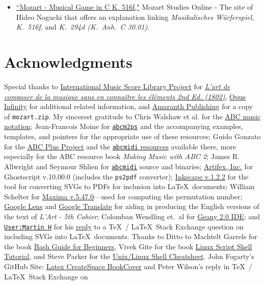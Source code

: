 \documentclass[a4paper,x11names,svgnames,10pt]{article}
\begin{document}
{\begin{itemize}
	\item \href{(http://www.asahi-net.or.jp/\~rb5h-ngc/e/k516f.htm}{``Mozart - Musical Game in C K. 516f,"}	Mozart Studies Online - The site of Hideo Noguchi that offers an explanation linking {\em Musikalisches W\"{u}rferspiel, K.\ 516f}, and  {\em K.\ 294d (K.\ Anh.\ C 30.01)}. 
\end{itemize}

\newpage
\section{Acknowledgments}
Special thanks to \href{https://imslp.org}{International Music Score Library Project} for \href{https://imslp.org/wiki/L'art\_de_composer\_de\_la_musique\_sans\_en\_conna\%C3\%AEtre\_les\_\%C3\%A9l\%C3\%A9ments\_(Calegari\%2C\_Antonio)}{\it L'art de composer de la musique sans en connaître les éléments  2nd Ed. (1802)}, \href{https://opus-infinity.org}{Opus Infinity} for additional related information, and \href{http://www.amaranthpublishing.com/MozartDiceGame.htm}{Amaranth Publishing} for a copy of {\tt mozart.zip}. My sincerest gratitude to Chris Walshaw et al. for the \href{http://www.abcnotation.com/}{ABC music notation}; Jean-Francois Moine for \href{http://moinejf.free.fr/}{\tt abcm2ps} and the accompanying examples, templates, and pointers for the appropriate use of these resources; Guido Gonzato for the \href{http://abcplus.sourceforge.net/}{ABC Plus Project} and the \href{http://abcplus.sourceforge.net/#abcMIDI}{{\tt abcmidi} resources} available there, more especially for the ABC resource book {\em Making Music with ABC 2}; James R. Allwright and Seymour Shlien for \href{http://abc.sourceforge.net/abcMIDI}{\tt abcmidi} source and binaries; \href{https://artifex.com/}{Artifex, Inc.} for Ghostscript v.10.00.0 (includes the {\tt ps2pdf} converter); \href{https://www.inkscape.org/}{Inkscape v.1.2.2} for the tool for converting SVGs to PDFs for inclusion into \LaTeX\ documents; William Schelter for \href{https://maxima.sourceforge.io}{Maxima v.5.47.0}---used for computing the permutation number; \href{https://google.lens}{Google Lens} and \href{https://translate.google.com}{Google Translate} for aiding in producing the English versions of the text of {\it L'Art - 5th Cahier}; Colomban Wendling et.\ al for \href{https://www.geany.org}{Geany 2.0 IDE}; and \href{https://tex.stackexchange.com/users/632/martin-h}{\tt User:Martin H} for his \href{https://tex.stackexchange.com/questions/2099/how-to-include-svg-diagrams-in-latex}{reply} to a \TeX\ / \LaTeX\ Stack Exchange question on including SVGs into \LaTeX\ documents. Thanks to  Ditto to Machtelt Garrels for the book \href{http://tldp.org/LDP/Bash-Beginners-Guide/html/Bash-Beginners-Guide.html}{Bash Guide for Beginners}, Vivek Gite for the book \href{http://www.freeos.com/guides/lsst/}{Linux Script Shell Tutorial}, and Steve Parker for the \href{http://steve-parker.org/sh/cheatsheet.pdf}{Unix/Linux Shell Cheatsheet}. John Fogarty's GitHub Site: \href{https://github.com/jfogarty/latex-createspace-bookcover}{Latex CreateSpace BookCover} and Peter Wilson's reply in  \TeX\ / \LaTeX\ Stack Exchange on }
\end{document}
